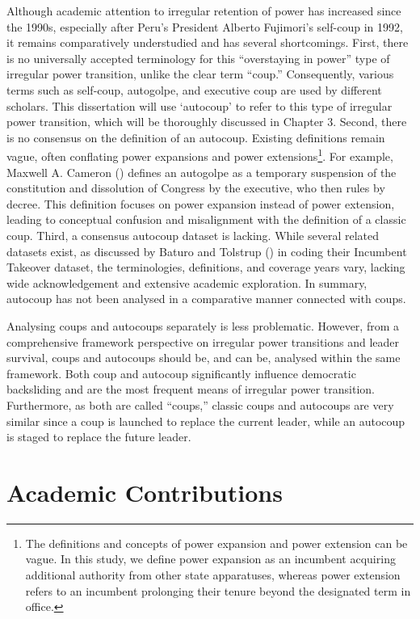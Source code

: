 \documentclass[
  12pt,
]{report}
\begin{document}
Although academic attention to irregular retention of power has
increased since the 1990s, especially after Peru's President Alberto
Fujimori's self-coup in 1992, it remains comparatively understudied and
has several shortcomings. First, there is no universally accepted
terminology for this ``overstaying in power'' type of irregular power
transition, unlike the clear term ``coup.'' Consequently, various terms
such as self-coup, autogolpe, and executive coup are used by different
scholars. This dissertation will use `autocoup' to refer to this type of
irregular power transition, which will be thoroughly discussed in
Chapter 3. Second, there is no consensus on the definition of an
autocoup. Existing definitions remain vague, often conflating power
expansions and power extensions\footnote{The definitions and concepts of
  power expansion and power extension can be vague. In this study, we
  define power expansion as an incumbent acquiring additional authority
  from other state apparatuses, whereas power extension refers to an
  incumbent prolonging their tenure beyond the designated term in
  office.}. For example, Maxwell A. Cameron
() defines an autogolpe as a temporary
suspension of the constitution and dissolution of Congress by the
executive, who then rules by decree. This definition focuses on power
expansion instead of power extension, leading to conceptual confusion
and misalignment with the definition of a classic coup. Third, a
consensus autocoup dataset is lacking. While several related datasets
exist, as discussed by Baturo and Tolstrup
() in coding their Incumbent Takeover
dataset, the terminologies, definitions, and coverage years vary,
lacking wide acknowledgement and extensive academic exploration. In
summary, autocoup has not been analysed in a comparative manner
connected with coups.

Analysing coups and autocoups separately is less problematic. However,
from a comprehensive framework perspective on irregular power
transitions and leader survival, coups and autocoups should be, and can
be, analysed within the same framework. Both coup and autocoup
significantly influence democratic backsliding and are the most frequent
means of irregular power transition. Furthermore, as both are called
``coups,'' classic coups and autocoups are very similar since a coup is
launched to replace the current leader, while an autocoup is staged to
replace the future leader.

\section{Academic Contributions}\label{academic-contributions}
\end{document}
